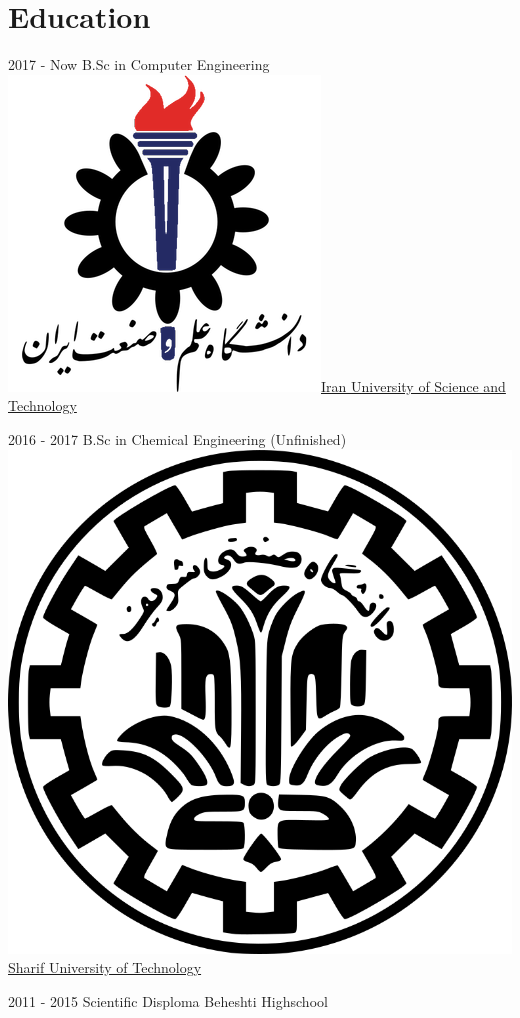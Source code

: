 \documentclass[a4paper]{friggeri-cv}
\begin{document}
\section{Education}
\begin{entrylist}
  \entry
    {2017 - Now}
    {     B.Sc in Computer Engineering}
    {\href{http://www.iust.ac.ir/}{\includegraphics[scale=0.06]{img/IUST_logo_color.png}Iran University of Science and Technology}}
    {}

  \entry
    {2016 - 2017}
    {    B.Sc in Chemical Engineering (Unfinished)}
    {\href{http://www.sharif.ir}{\includegraphics[scale=0.015]{img/Sharif_logo.png} Sharif University of Technology}}
    {}

  \entry
    {2011 - 2015}
    {    Scientific Disploma}
    {Beheshti Highschool}
  {}
\end{entrylist}
\end{document}
